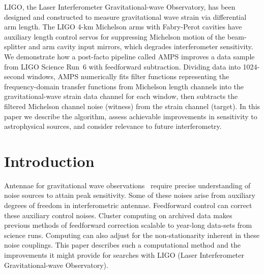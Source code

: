 LIGO, the Laser Interferometer Gravitational-wave Observatory, has been designed and constructed to measure gravitational wave strain via differential arm length. The LIGO 4-km Michelson arms with Fabry-Perot cavities have auxiliary length control servos for suppressing Michelson motion of the beam-splitter and arm cavity input mirrors, which degrades interferometer sensitivity. We demonstrate how a post-facto pipeline called AMPS improves a data sample from LIGO Science Run~6 with feedforward subtraction. Dividing data into 1024-second windows, AMPS numerically fits filter functions representing the frequency-domain transfer functions from Michelson length channels into the gravitational-wave strain data channel for each window, then subtracts the filtered Michelson channel noise (witness) from the strain channel (target). In this paper we describe the algorithm, assess achievable improvements in sensitivity to astrophysical sources, and consider relevance to future interferometry.



    \section{Introduction}
    \label{introduction}

Antennae for gravitational wave observations~\cite{Thorne300} require precise understanding of noise sources to attain peak sensitivity. Some of these noises arise from auxiliary degrees of freedom in interferometric antennae. Feedforward control can correct these auxiliary control noises. Cluster computing on archived data makes previous methods of feedforward correction scalable to year-long data-sets from science runs. Computing can also adjust for the non-stationarity inherent in these noise couplings. This paper describes such a computational method and the improvements it might provide for searches with LIGO (Laser Interferometer Gravitational-wave Observatory).

